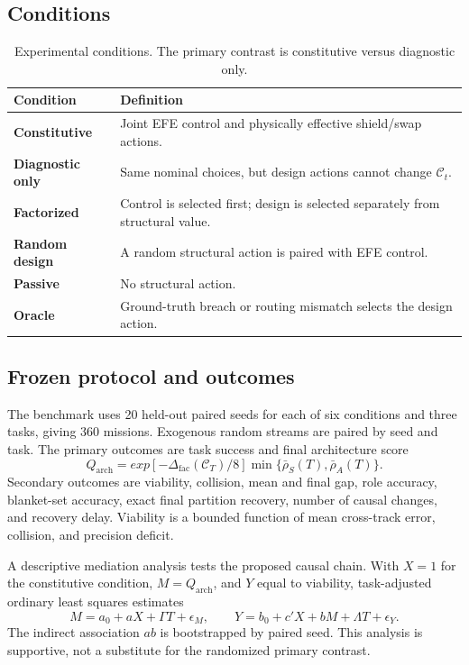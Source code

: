 \documentclass[11pt,a4paper]{article}
\numberwithin{equation}{section}
\newcommand{\Corg}{\mathcal{C}}
\newcommand{\Gap}{\Delta_{\mathrm{fac}}}
\newcommand{\NSeeds}{20}
\newcommand{\NTotal}{360}
\begin{document}
\subsection{Conditions}

\begin{table}[t]
\centering
\small
\begin{tabularx}{\textwidth}{>{\bfseries}lX}
\toprule
Condition & Definition \\
\midrule
Constitutive & Joint EFE control and physically effective shield/swap actions. \\
Diagnostic only & Same nominal choices, but design actions cannot change $\Corg_t$. \\
Factorized & Control is selected first; design is selected separately from structural value. \\
Random design & A random structural action is paired with EFE control. \\
Passive & No structural action. \\
Oracle & Ground-truth breach or routing mismatch selects the design action. \\
\bottomrule
\end{tabularx}
\caption{Experimental conditions. The primary contrast is constitutive versus diagnostic only.}
\label{tab:conditions}
\end{table}

\subsection{Frozen protocol and outcomes}

The benchmark uses \NSeeds{} held-out paired seeds for each of six conditions
and three tasks, giving \NTotal{} missions. Exogenous random streams are paired
by seed and task. The primary outcomes are task success and final architecture
score
\begin{equation}
 Q_{\mathrm{arch}}=exp[-\Gap(\Corg_T)/8]
 \min\{\bar\rho_S(T),\bar\rho_A(T)\}.
 \label{eq:architecture-score}
\end{equation}
Secondary outcomes are viability, collision, mean and final gap, role
accuracy, blanket-set accuracy, exact final partition recovery, number of
causal changes, and recovery delay. Viability is a bounded function of mean
cross-track error, collision, and precision deficit.

A descriptive mediation analysis tests the proposed causal chain. With
$X=1$ for the constitutive condition, $M=Q_{\mathrm{arch}}$, and $Y$ equal to
viability, task-adjusted ordinary least squares estimates
\begin{equation}
 M=a_0+aX+\Gamma T+\epsilon_M,\qquad
 Y=b_0+c'X+bM+\Lambda T+\epsilon_Y.
 \label{eq:mediation}
\end{equation}
The indirect association $ab$ is bootstrapped by paired seed. This analysis is
supportive, not a substitute for the randomized primary contrast.
\end{document}
